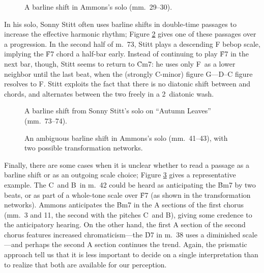 \begin{figure}[tbp]
  \caption[A barline shift from Ammons's solo.]{A barline shift in Ammons's
    solo (mm.~29--30).}
  \label{csa:metric-delay}
\end{figure}

In his solo, Sonny Stitt often uses barline shifts in double-time passages to
increase the effective harmonic rhythm; Figure \ref{csa:stitt-double-time}
gives one of these passages over a \tf progression. In the second
half of m.~73, Stitt plays a descending F bebop scale, implying the \h{F7}
chord a half-bar early. Instead of continuing to play \h{F7} in the
next bar, though, Stitt seems to return to \h{Cm7}: he uses only F\sharp\ as a
lower neighbor until the last beat, when the (strongly C-minor) figure
G--\Eflat--D--C figure resolves to F\nat. Stitt exploits the fact that there
is no diatonic shift between \ii and \V chords, and alternates between the
two freely in a 2\flat\ diatonic wash.

\begin{figure}[tbp]
  \caption[A barline shift from Sonny Stitt's solo on ``Autumn Leaves.'']{A
    barline shift from Sonny Stitt's solo on ``Autumn Leaves'' (mm.~73--74).}
  \label{csa:stitt-double-time}
\end{figure}

\begin{figure}[tbp]
  \caption[An ambiguous barline shift in Ammon's solo, with two possible
  transformation networks.]{An ambiguous barline shift in Ammons's
  solo (mm.~41--43), with two possible transformation networks.}
  \label{csa:metric-parsing}
\end{figure}

Finally, there are some cases when it is unclear whether to read a passage as
a barline shift or as an outgoing scale choice; Figure
\ref{csa:metric-parsing} gives a representative example. The
C\sharp\ and B\nat\ in m.~42 could be heard as anticipating the \h{Bm7} by two
beats, or as part of a whole-tone scale over \h{F7} (as shown in the
transformation networks). Ammons anticipates the \h{Bm7} in the A sections of
the first chorus (mm.~3 and 11, the second with the pitches C\sharp\ and
B\nat), giving some credence to the anticipatory hearing. On the other hand,
the first A section of the second chorus features increased chromaticism---the
\h{D7} in m.~38 uses a diminished scale---and perhaps the second A section
continues the trend. Again, the prismatic approach tell us that it is less
important to decide on a single interpretation than to realize that both
are available for our perception.

